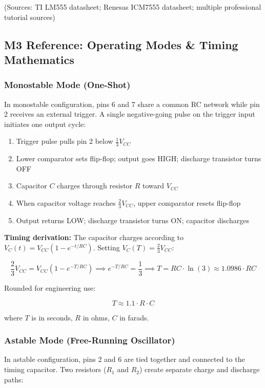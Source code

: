 \documentclass[11pt,letterpaper]{article}
\begin{document}
(Sources: TI LM555 datasheet; Renesas ICM7555 datasheet; multiple professional tutorial sources)

\subsection{M3 Reference: Operating Modes \& Timing Mathematics}

\subsubsection{Monostable Mode (One-Shot)}

In monostable configuration, pins 6 and 7 share a common RC network while pin 2 receives an external trigger. A single negative-going pulse on the trigger input initiates one output cycle:

\begin{enumerate}[leftmargin=2em]
  \item Trigger pulse pulls pin 2 below $\frac{1}{3}V_{CC}$
  \item Lower comparator sets flip-flop; output goes HIGH; discharge transistor turns OFF
  \item Capacitor $C$ charges through resistor $R$ toward $V_{CC}$
  \item When capacitor voltage reaches $\frac{2}{3}V_{CC}$, upper comparator resets flip-flop
  \item Output returns LOW; discharge transistor turns ON; capacitor discharges
\end{enumerate}

\textbf{Timing derivation:} The capacitor charges according to $V_C(t) = V_{CC}(1 - e^{-t/RC})$. Setting $V_C(T) = \frac{2}{3}V_{CC}$:

$$\frac{2}{3}V_{CC} = V_{CC}(1 - e^{-T/RC}) \implies e^{-T/RC} = \frac{1}{3} \implies T = RC \cdot \ln(3) \approx 1.0986 \cdot RC$$

Rounded for engineering use:

$$\boxed{T \approx 1.1 \cdot R \cdot C}$$

where $T$ is in seconds, $R$ in ohms, $C$ in farads.

\subsubsection{Astable Mode (Free-Running Oscillator)}

In astable configuration, pins 2 and 6 are tied together and connected to the timing capacitor. Two resistors ($R_1$ and $R_2$) create separate charge and discharge paths:
\end{document}
